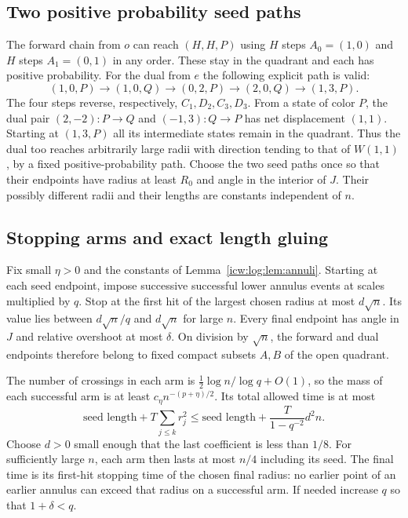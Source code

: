 \documentclass[11pt,letterpaper]{article}
\theoremstyle{remark}\newtheorem{remark}[theorem]{Remark}
\newcommand{\1}{\mathbf1}
\begin{document}
\subsection{Two positive probability seed paths}
The forward chain from $o$ can reach $(H,H,P)$ using $H$ steps
$A_0=(1,0)$ and $H$ steps $A_1=(0,1)$ in any order. These stay in the
quadrant and each has positive probability. For the dual from $e$ the
following explicit path is valid:
\begin{equation}\label{icw:log:eq:seed}
 (1,0,P)\to(1,0,Q)\to(0,2,P)\to(2,0,Q)\to(1,3,P).
\end{equation}
The four steps reverse, respectively, $C_1,D_2,C_3,D_3$.
From a state of color $P$, the dual pair
$(2,-2):P\to Q$ and $(-1,3):Q\to P$ has net displacement $(1,1)$.
Starting at $(1,3,P)$ all its intermediate states remain in the quadrant.
Thus the dual too reaches arbitrarily large radii with direction tending
to that of $W(1,1)$, by a fixed positive-probability path. Choose the two
seed paths once so that their endpoints have radius at least $R_0$ and
angle in the interior of $J$. Their possibly different radii and their
lengths are constants independent of $n$.

\subsection{Stopping arms and exact length gluing}
Fix small $\eta>0$ and the constants of Lemma~\ref{icw:log:lem:annuli}. Starting
at each seed endpoint, impose successive successful lower annulus events
at scales multiplied by $q$. Stop at the first hit of the largest chosen
radius at most $d\sqrt n$. Its value lies between $d\sqrt n/q$ and
$d\sqrt n$ for large $n$. Every final endpoint has angle in $J$ and
relative overshoot at most $\delta$. On division by $\sqrt n$, the
forward and dual endpoints therefore belong to fixed compact subsets
$A,B$ of the open quadrant.

The number of crossings in each arm is
$\frac12\log n/\log q+O(1)$, so the mass of each successful arm is at
least $c_\eta n^{-(p+\eta)/2}$. Its total allowed time is at most
\[
 \text{seed length}+T\sum_{j\le k}r_j^2
 \le \text{seed length}+\frac{T}{1-q^{-2}}d^2n.
\]
Choose $d>0$ small enough that the last coefficient is less than $1/8$.
For sufficiently large $n$, each arm then lasts at most $n/4$ including
its seed. The final time is its first-hit stopping time of the chosen
final radius: no earlier point of an earlier annulus can exceed that
radius on a successful arm. If needed increase $q$ so that
$1+\delta<q$.
\end{document}
